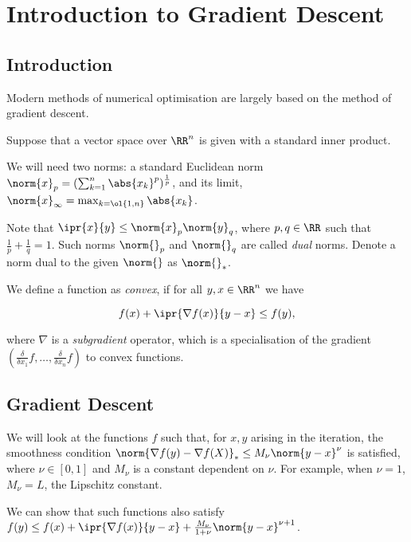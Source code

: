 \documentclass[11pt]{scrartcl}
\begin{document}
  \section{Introduction to Gradient Descent}

  \subsection{Introduction}
  
  Modern methods of numerical optimisation are largely based on the
  method of gradient descent.

  Suppose that a vector space over $\RR^{n}$ is given with a standard
  inner product.

  We will need two norms: a standard Euclidean norm
  $\norm{x}_{p} = (\sum_{k=1}^{n}\abs{x_{k}}^{p})^{\frac{1}{p}}$, and
  its limit, $\norm{x}_{\infty} = \max_{k=\ol{1,n}}\abs{x_{k}}$.

  Note that $\ipr{x}{y} \leq \norm{x}_{p}\norm{y}_{q}$, where
  $p, q\in\RR$ such that $\frac{1}{p}+ \frac{1}{q} = 1$. Such norms
  $\norm{\*}_{p}$ and $\norm{\*}_{q}$ are called \textit{dual} norms.
  Denote a norm dual to the given $\norm{\*}$ as $\norm{\*}_{*}$.

  We define a function as \textit{convex}, if for all
  $y, x \in \RR^{n}$ we have
  
  \begin{equation*}
    f(x) + \ipr{\nabla f(x)}{y-x}\leq f(y),
  \end{equation*}

  where $\nabla$ is a \textit{subgradient} operator, which is a
  specialisation of the gradient
  $(\frac{\delta}{\delta x_{1}}f, \dots, \frac{\delta}{\delta
    x_{n}}f)$ to convex functions.

  \subsection{Gradient Descent}

  We will look at the functions $f$ such that, for $x, y$ arising in
  the iteration, the smoothness condition
  $\norm{\nabla f(y) - \nabla f(X)}_{*} \leq M_{\nu}\norm{y-x}^{\nu}$
  is satisfied, where $\nu \in [0, 1]$ and $M_{\nu}$ is a constant
  dependent on $\nu$. For example, when $\nu = 1$, $M_{\nu} = L$, the
  Lipschitz constant.

  We can show that such functions also satisfy
  $f(y) \leq f(x) + \ipr{\nabla f(x)}{y-x} +
  \frac{M_{\nu}}{1+\nu}\norm{y-x}^{\nu + 1}$.
\end{document}
